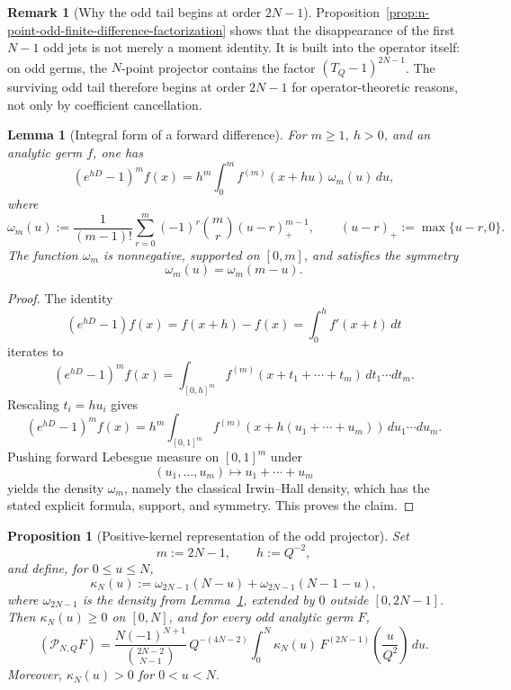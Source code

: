 \documentclass[11pt,a4paper]{amsart}
\theoremstyle{plain}
\newtheorem{proposition}[theorem]{Proposition}
\newtheorem{lemma}[theorem]{Lemma}
\theoremstyle{definition}
\newtheorem{remark}[theorem]{Remark}
\begin{document}
\begin{remark}[Why the odd tail begins at order $2N-1$]
\label{rem:n-point-odd-tail-begins-by-factorization}
Proposition~\ref{prop:n-point-odd-finite-difference-factorization} shows that
the disappearance of the first $N-1$ odd jets is not merely a moment
identity. It is built into the operator itself: on odd germs, the
$N$-point projector contains the factor $(T_Q-1)^{2N-1}$. The surviving
odd tail therefore begins at order $2N-1$ for operator-theoretic reasons,
not only by coefficient cancellation.
\end{remark}

\begin{lemma}[Integral form of a forward difference]
\label{lem:forward-difference-integral-form}
For $m\ge 1$, $h>0$, and an analytic germ $f$, one has
\[
(e^{hD}-1)^m f(x)
=
h^m\int_0^m f^{(m)}(x+hu)\,\omega_m(u)\,du,
\]
where
\[
\omega_m(u)
:=
\frac{1}{(m-1)!}
\sum_{r=0}^{m}(-1)^r\binom{m}{r}(u-r)_+^{m-1},
\qquad
(u-r)_+:=\max\{u-r,0\}.
\]
The function $\omega_m$ is nonnegative, supported on $[0,m]$, and
satisfies the symmetry
\[
\omega_m(u)=\omega_m(m-u).
\]
\end{lemma}

\begin{proof}
The identity
\[
(e^{hD}-1)f(x)=f(x+h)-f(x)=\int_0^h f'(x+t)\,dt
\]
iterates to
\[
(e^{hD}-1)^m f(x)
=
\int_{[0,h]^m}
f^{(m)}(x+t_1+\cdots+t_m)\,dt_1\cdots dt_m.
\]
Rescaling $t_i=hu_i$ gives
\[
(e^{hD}-1)^m f(x)
=
h^m
\int_{[0,1]^m}
f^{(m)}(x+h(u_1+\cdots+u_m))\,du_1\cdots du_m.
\]
Pushing forward Lebesgue measure on $[0,1]^m$ under
\[
(u_1,\dots,u_m)\mapsto u_1+\cdots+u_m
\]
yields the density $\omega_m$, namely the classical Irwin--Hall density,
which has the stated explicit formula, support, and symmetry. This proves the
claim.
\end{proof}

\begin{proposition}[Positive-kernel representation of the odd projector]
\label{prop:n-point-odd-positive-kernel}
Set
\[
m:=2N-1,
\qquad
h:=Q^{-2},
\]
and define, for $0\le u\le N$,
\[
\kappa_N(u):=\omega_{2N-1}(N-u)+\omega_{2N-1}(N-1-u),
\]
where $\omega_{2N-1}$ is the density from
Lemma~\ref{lem:forward-difference-integral-form}, extended by $0$ outside
$[0,2N-1]$. Then $\kappa_N(u)\ge 0$ on $[0,N]$, and for every odd
analytic germ $F$,
\[
(\mathcal P_{N,Q}F)
=
\frac{N(-1)^{N+1}}{\binom{2N-2}{N-1}}\,
Q^{-(4N-2)}
\int_0^N
\kappa_N(u)\,
F^{(2N-1)}\!\left(\frac{u}{Q^2}\right)\,du.
\]
Moreover, $\kappa_N(u)>0$ for $0<u<N$.
\end{proposition}
\end{document}
